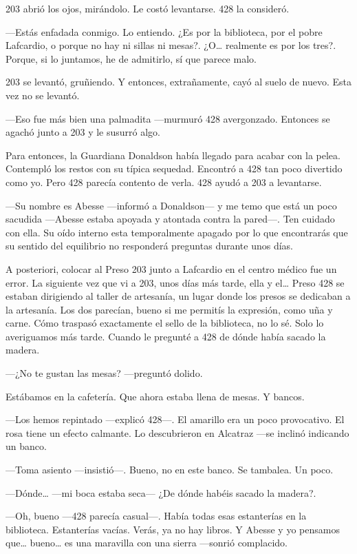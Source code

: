 203 abrió los ojos, mirándolo. Le costó levantarse. 428 la consideró.

---Estás enfadada conmigo. Lo entiendo. ¿Es por la biblioteca, por el
pobre Lafcardio, o porque no hay ni sillas ni mesas?. ¿O\ldots{}
realmente es por los tres?. Porque, si lo juntamos, he de admitirlo, sí
que parece malo.

203 se levantó, gruñiendo. Y entonces, extrañamente, cayó al suelo de
nuevo. Esta vez no se levantó.

---Eso fue más bien una palmadita ---murmuró 428 avergonzado. Entonces
se agachó junto a 203 y le susurró algo.

Para entonces, la Guardiana Donaldson había llegado para acabar con la
pelea. Contempló los restos con su típica sequedad. Encontró a 428 tan
poco divertido como yo. Pero 428 parecía contento de verla. 428 ayudó a
203 a levantarse.

---Su nombre es Abesse ---informó a Donaldson--- y me temo que está un
poco sacudida ---Abesse estaba apoyada y atontada contra la pared---.
Ten cuidado con ella. Su oído interno esta temporalmente apagado por lo
que encontrarás que su sentido del equilibrio no responderá preguntas
durante unos días.

A posteriori, colocar al Preso 203 junto a Lafcardio en el centro médico
fue un error. La siguiente vez que vi a 203, unos días más tarde, ella y
el\ldots{} Preso 428 se estaban dirigiendo al taller de artesanía, un
lugar donde los presos se dedicaban a la artesanía. Los dos parecían,
bueno si me permitís la expresión, como uña y carne. Cómo traspasó
exactamente el sello de la biblioteca, no lo sé. Solo lo averiguamos más
tarde. Cuando le pregunté a 428 de dónde había sacado la madera.

---¿No te gustan las mesas? ---preguntó dolido.

Estábamos en la cafetería. Que ahora estaba llena de mesas. Y bancos.

---Los hemos repintado ---explicó 428---. El amarillo era un poco
provocativo. El rosa tiene un efecto calmante. Lo descubrieron en
Alcatraz ---se inclinó indicando un banco.

---Toma asiento ---insistió---. Bueno, no en este banco. Se tambalea. Un
poco.

---Dónde\ldots{} ---mi boca estaba seca--- ¿De dónde habéis sacado la
madera?.

---Oh, bueno ---428 parecía casual---. Había todas esas estanterías en
la biblioteca. Estanterías vacías. Verás, ya no hay libros. Y Abesse y
yo pensamos que\ldots{} bueno\ldots{} es una maravilla con una sierra
---sonrió complacido.

